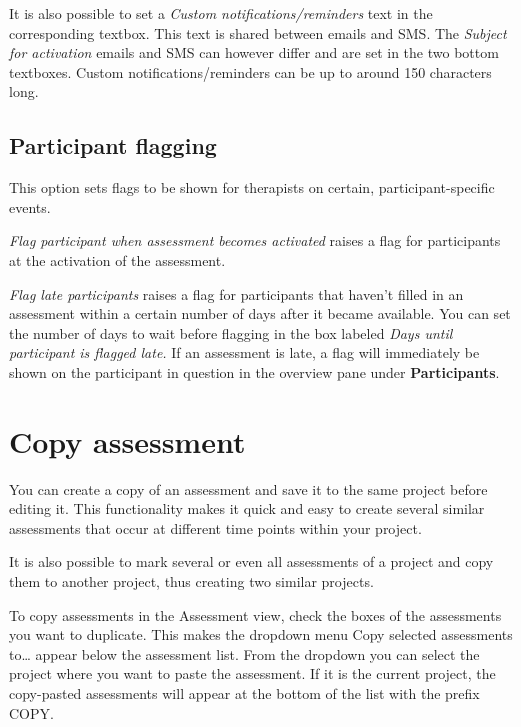\documentclass[]{book}
\begin{document}
It is also possible to set a \emph{Custom notifications/reminders} text in the corresponding textbox. This text is shared between emails and SMS. The \emph{Subject for activation} emails and SMS can however differ and are set in the two bottom textboxes. Custom notifications/reminders can be up to around 150 characters long.

\hypertarget{participant-flagging}{%
\subsection{Participant flagging}\label{participant-flagging}}

This option sets flags to be shown for therapists on certain, participant-specific events.

\emph{Flag participant when assessment becomes activated} raises a flag for participants at the activation of the assessment.

\emph{Flag late participants} raises a flag for participants that haven't filled in an assessment within a certain number of days after it became available. You can set the number of days to wait before flagging in the box labeled \emph{Days until participant is flagged late.} If an assessment is late, a flag will immediately be shown on the participant in question in the overview pane under \textbf{Participants}.

\hypertarget{copy-assessment}{%
\section{Copy assessment}\label{copy-assessment}}

You can create a copy of an assessment and save it to the same project before editing it. This functionality makes it quick and easy to create several similar assessments that occur at different time points within your project.

It is also possible to mark several or even all assessments of a project and copy them to another project, thus creating two similar projects.

To copy assessments in the Assessment view, check the boxes of the assessments you want to duplicate. This makes the dropdown menu Copy selected assessments to\ldots{} appear below the assessment list. From the dropdown you can select the project where you want to paste the assessment. If it is the current project, the copy-pasted assessments will appear at the bottom of the list with the prefix COPY.
\end{document}
